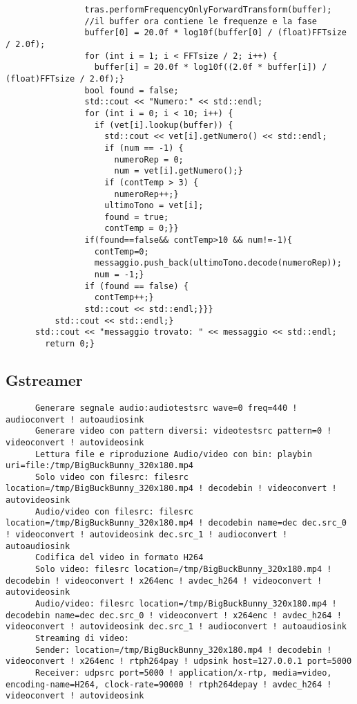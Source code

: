 \documentclass[8pt,a4paper]{article}
\begin{document}
\begin{multicols}{5}
\begin{verbatim}
                tras.performFrequencyOnlyForwardTransform(buffer);
                //il buffer ora contiene le frequenze e la fase
                buffer[0] = 20.0f * log10f(buffer[0] / (float)FFTsize / 2.0f);
                for (int i = 1; i < FFTsize / 2; i++) {
                  buffer[i] = 20.0f * log10f((2.0f * buffer[i]) / (float)FFTsize / 2.0f);}
                bool found = false;
                std::cout << "Numero:" << std::endl;
                for (int i = 0; i < 10; i++) {
                  if (vet[i].lookup(buffer)) {
                    std::cout << vet[i].getNumero() << std::endl;
                    if (num == -1) {
                      numeroRep = 0;
                      num = vet[i].getNumero();}
                    if (contTemp > 3) {
                      numeroRep++;}
                    ultimoTono = vet[i];
                    found = true;
                    contTemp = 0;}}
                if(found==false&& contTemp>10 && num!=-1){
                  contTemp=0;
                  messaggio.push_back(ultimoTono.decode(numeroRep));
                  num = -1;}
                if (found == false) {
                  contTemp++;}
                std::cout << std::endl;}}}
          std::cout << std::endl;}
      std::cout << "messaggio trovato: " << messaggio << std::endl;
        return 0;}
    \end{verbatim}
    \subsection{Gstreamer}
    \begin{verbatim}
      Generare segnale audio:audiotestsrc wave=0 freq=440 ! audioconvert ! autoaudiosink
      Generare video con pattern diversi: videotestsrc pattern=0 ! videoconvert ! autovideosink
      Lettura file e riproduzione Audio/video con bin: playbin uri=file:/tmp/BigBuckBunny_320x180.mp4
      Solo video con filesrc: filesrc location=/tmp/BigBuckBunny_320x180.mp4 ! decodebin ! videoconvert ! autovideosink
      Audio/video con filesrc: filesrc location=/tmp/BigBuckBunny_320x180.mp4 ! decodebin name=dec dec.src_0 ! videoconvert ! autovideosink dec.src_1 ! audioconvert ! autoaudiosink
      Codifica del video in formato H264
      Solo video: filesrc location=/tmp/BigBuckBunny_320x180.mp4 ! decodebin ! videoconvert ! x264enc ! avdec_h264 ! videoconvert ! autovideosink
      Audio/video: filesrc location=/tmp/BigBuckBunny_320x180.mp4 ! decodebin name=dec dec.src_0 ! videoconvert ! x264enc ! avdec_h264 ! videoconvert ! autovideosink dec.src_1 ! audioconvert ! autoaudiosink
      Streaming di video:
      Sender: location=/tmp/BigBuckBunny_320x180.mp4 ! decodebin ! videoconvert ! x264enc ! rtph264pay ! udpsink host=127.0.0.1 port=5000
      Receiver: udpsrc port=5000 ! application/x-rtp, media=video, encoding-name=H264, clock-rate=90000 ! rtph264depay ! avdec_h264 ! videoconvert ! autovideosink
    \end{verbatim}
\end{multicols}
\end{document}
